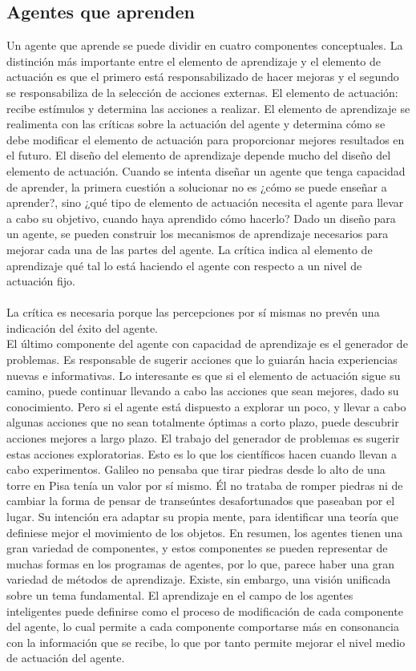 \documentclass[12pt,a4paper]{report}
\begin{document}
\subsection*{Agentes que aprenden}
Un agente que aprende se puede dividir en cuatro componentes conceptuales. La distinción más importante entre el elemento de aprendizaje y el elemento de actuación es que el primero está responsabilizado de hacer mejoras y el segundo se responsabiliza de la selección de acciones externas. El elemento de actuación: recibe estímulos y determina las acciones a realizar. El elemento de aprendizaje se realimenta con las críticas sobre la actuación del agente y determina cómo se debe modificar el elemento de actuación para proporcionar mejores resultados en el futuro. El diseño del elemento de aprendizaje depende mucho del diseño del elemento de actuación. Cuando se intenta diseñar un agente que tenga capacidad de aprender, la primera cuestión a solucionar no es ¿cómo se puede enseñar a aprender?, sino ¿qué tipo de elemento de actuación necesita el agente para llevar a cabo su objetivo, cuando haya aprendido cómo hacerlo? Dado un diseño para un agente, se pueden construir los mecanismos de aprendizaje necesarios para mejorar cada una de las partes del agente. La crítica indica al elemento de aprendizaje qué tal lo está haciendo el agente con respecto a un nivel de actuación fijo.\\\\ La crítica es necesaria porque las percepciones por sí mismas no prevén una indicación del éxito del agente.\\El último componente del agente con capacidad de aprendizaje es el generador de problemas. Es responsable de sugerir acciones que lo guiarán hacia experiencias nuevas e informativas. Lo interesante es que si el elemento de actuación sigue su camino, puede continuar llevando a cabo las acciones que sean mejores, dado su conocimiento. Pero si el agente está dispuesto a explorar un poco, y llevar a cabo algunas acciones que no sean totalmente óptimas a corto plazo, puede descubrir acciones mejores a largo plazo. El trabajo del generador de problemas es sugerir estas acciones exploratorias. Esto es lo que los científicos hacen cuando llevan a cabo experimentos. Galileo no pensaba que tirar piedras desde lo alto de una torre en Pisa tenía un valor por sí mismo. Él no trataba de romper piedras ni de cambiar la forma de pensar de transeúntes desafortunados que paseaban por el lugar. Su intención era adaptar su propia mente, para identificar una teoría que definiese mejor el movimiento de los objetos. En resumen, los agentes tienen una gran variedad de componentes, y estos componentes se pueden representar de muchas formas en los programas de agentes, por lo que, parece haber una gran variedad de métodos de aprendizaje. Existe, sin embargo, una visión unificada sobre un tema fundamental. El aprendizaje en el campo de los agentes inteligentes puede definirse como el proceso de modificación de cada componente del agente, lo cual permite a cada componente comportarse más en consonancia con la información que se recibe, lo que por tanto permite mejorar el nivel medio de actuación del agente.
\end{document}
